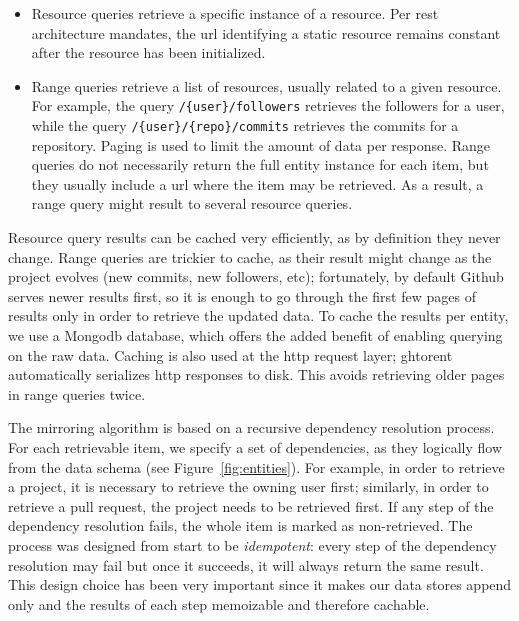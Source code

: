 \documentclass[conference]{IEEEtran}
\begin{document}
\begin{itemize}

  \item Resource queries retrieve a specific instance of a resource. Per 
    {\sc rest} architecture mandates, the {\sc url} identifying a static
    resource remains constant after the resource has been initialized. 

  \item Range queries retrieve a list of resources, usually related to a given
    resource. For example, the query \texttt{/\{user\}/followers} retrieves the
    followers for a user, while the query \texttt{/\{user\}/\{repo\}/commits}
    retrieves the commits for a repository. Paging is used to limit the amount
    of data per response. Range queries do not necessarily return the full
    entity instance for each item, but they usually include a {\sc url} where
    the item may be retrieved. As a result, a range query might result to
    several resource queries.

\end{itemize}

Resource query results can be cached very efficiently, as by definition they never change. Range queries are trickier to cache, as their result might
change as the project evolves (new commits, new followers, etc); fortunately, by
default Github serves newer results first, so it is enough to go through the
first few pages of results only in order to retrieve the updated data. To cache
the results per entity, we use a Mongo{\sc db} database, which offers the added
benefit of enabling querying on the raw data. Caching is also used at the {\sc
http} request layer; {\sc ght}orent automatically serializes {\sc http}
responses to disk. This avoids retrieving older pages in range queries twice.

%
The mirroring algorithm is based on a recursive dependency resolution process.
For each retrievable item, we specify a set of dependencies, as they logically
flow from the data schema (see Figure~\ref{fig:entities}). For example, in order
to retrieve a \textsf{project}, it is necessary to retrieve the owning
\textsf{user} first; similarly, in order to retrieve a pull request, the
\textsf{project} needs to be retrieved first. If any step of the dependency
resolution fails, the whole item is marked as non-retrieved.  The process was
designed from start to be \emph{idempotent}: every step of the dependency
resolution may fail but once it succeeds, it will always return the same result.
This design choice has been very important since it makes our data stores append
only and the results of each step memoizable and therefore cachable.
\end{document}
